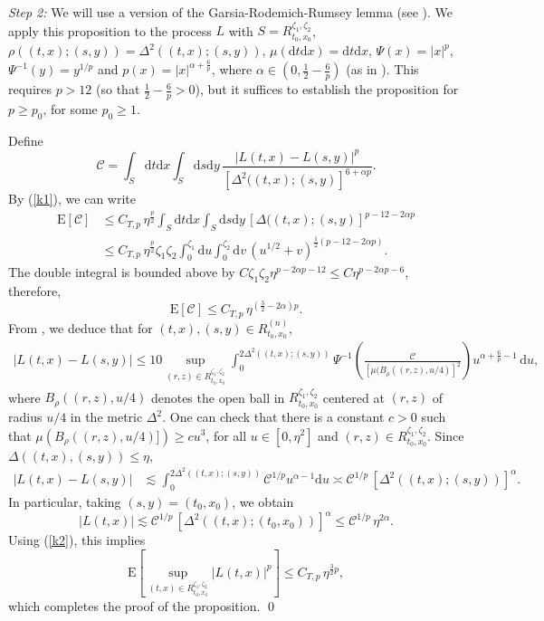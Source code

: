 \documentclass[12pt,a4paper]{article}
\newcommand{\E}{\mathrm{E}}
\renewcommand{\d}{\mathrm{d}}
\newcommand{\<}{\langle}
\renewcommand{\>}{\rangle}
\begin{document}
 \noindent
 {\it Step 2:}  We will use a version of the Garsia-Rodemich-Rumsey lemma (see \cite[Lemma A.3.5]{dss}). We apply this proposition to the process $L$ with $S=R_{t_0,x_0}^{\zeta_1, \zeta_2}$, $\rho((t,x);(s,y))=\Delta^2((t,x);(s,y))$, $\mu(\d t \d x)=\d t \d x$,
 $\Psi(x)=|x|^p$, $\Psi^{-1}(y)=y^{1/p}$ and $p(x)=|x|^{\alpha+\frac 6 p}$, where $\alpha\in \left(0,\frac 12-\frac 6p\right)$ (as in \cite[Corollary A.3]{DKN07}).  This requires $p>12$ (so that $\frac 12-\frac 6p > 0$), but it suffices to establish the proposition for $p\ge p_0$, for  some $p_0 \geq 1$.
 
 Define
 \[
 \mathscr{C}=\int_S \d t\d x\int_S \d s \d y\,  \frac { |L(t,x)-L(s,y)|^p}{ [ \Delta^2((t,x);(s,y)]^{6+\alpha p}}.
 \]
 By  (\ref{k1}), we can write
  \begin{align*}%
 \E [\mathscr{C}]& \le C_{T,p}\, \eta^{\frac {p}2} \int_S \d t\d x\int_S \d s \d y\,   [ \Delta((t,x);(s,y)]^{ p - 12-2\alpha p} \\ %
 & \le C_{T,p}\, \eta^{\frac {p}2}\zeta_1\zeta_2 \int_0^{\zeta_1} \d u \int_0^{\zeta_2} \d v\, (u^{1/2}+v)^{\frac 1 2 ( p  - 12 - 2\alpha p)}.
 \end{align*}
 The double integral is bounded above by $C \zeta_1\zeta_2 \eta^{p - 2 \alpha p - 12} \leq C \eta^{p - 2 \alpha p - 6}$, therefore,
 \begin{equation}
      \E [\mathscr{C}] \le C_{T,p} \, \eta^{(\frac 32 - 2\alpha )p}.  
 \label{k2}
 \end{equation}
 From  \cite[Proposition A.3.5]{dss}, we deduce that for $(t, x), (s, y) \in R_{t_0,x_0}^{(n)}$,
 \begin{align*}
      |L(t,x)-L(s,y)| \le 10 \sup_{(r,z)\in R^{\zeta_1, \zeta_2}_{t_0,x_0}} \int_0^{2\Delta^2((t,x);(s,y))} \Psi^{-1}
 \left( \frac {\mathscr{C}}{[\mu(B_\rho((r,z),u/4)]^2} \right) u^{\alpha+\frac 6p -1}\, \d u,
 \end{align*}
 where $B_\rho((r,z),u/4)$ denotes the open ball in $R_{t_0,x_0}^{\zeta_1, \zeta_2}$ centered at $(r, z)$ of radius $u/4$ in the metric $\Delta^2$. One can check that there is a constant $c>0$ such that  $\mu(B_\rho((r,z),u/4)]) \ge cu^3$, for all $u \in [0, \eta^2]$ and
 $(r,z)\in  R^{\zeta_1, \zeta_2}_{t_0,x_0}$. Since $\Delta((t, x), (s, y)) \leq \eta$, 
  \begin{align*}
      |L(t,x)-L(s,y)|  &\lesssim \int_0^{2\Delta^2((t,x);(s,y))} \mathscr{C}^{1/p} u^{\alpha-1} \d u
 \asymp \mathscr{C}^{1/p}\, [\Delta^2((t,x);(s,y))]^\alpha.
  \end{align*}
  In particular, taking $(s,y)=(t_0,x_0)$, we obtain
  \[
  |L(t,x)| \lesssim  \mathscr{C}^{1/p}\, [\Delta^2((t,x);(t_0,x_0))]^\alpha \le     \mathscr{C}^{1/p} \, \eta^{2\alpha}.
\]
Using (\ref{k2}), this implies
\[
\E \left[ \sup_{(t,x)\in R^{\zeta_1, \zeta_2} _{t_0,x_0}} |L(t,x)|^p \right] \le C_{T,p}\, \eta^{\frac 32 p},
\]
 which completes the proof of the proposition.
 \qed
 
\end{document}
